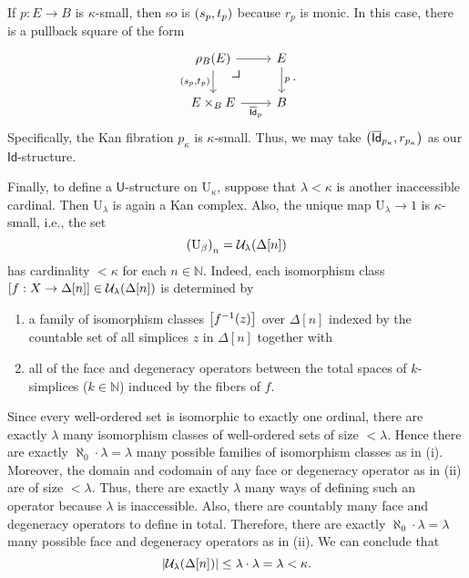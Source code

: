 \documentclass[10pt,letterpaper,cm]{nupset}
\theoremstyle{definition}
\theoremstyle{theorem}
\theoremstyle{remark}
\newcommand{\id}{\mathsf{Id}}
\newcommand{\U}{\mathsf{U}}
\newcommand{\0}{\mathbf{0}}
\newcommand{\1}{\mathbf{1}}
\newcommand{\2}{\mathbf{2}}
\newcommand{\N}{\mathbb N}
\newcommand{\be}{\begin{enumerate}}
\newcommand{\ee}{\end{enumerate}}
\begin{document}
\smallskip

If $p: E \to B$ is $\kappa$-small, then so is $\mleft(s_p, t_p\mright)$ because $r_p$ is monic. In this case, there is a pullback square of the form
\[
\begin{tikzcd}
\rho_B(E) \arrow[r] \arrow[d, "{\mleft(s_p, t_p\mright)}"'] \arrow[dr, phantom, "\scalebox{1.5}{\color{black}$\lrcorner$}" , very near start, color=black]
& E \arrow[d, "p"] \\
E\times_BE \arrow[r, "\overline{\id}_p"']                                      & B               
\end{tikzcd}.
\] 
Specifically,  the Kan fibration $p_{\kappa}$ is $\kappa$-small. Thus, we may take $\mleft(\overline{\id}_{p_{\kappa}}, r_{p_{\kappa}}\mright)$ as our $\id$-structure. 

\bigskip

Finally, to define a $\U$-structure on $\mathrm{U}_{\kappa}$, suppose that $\lambda < \kappa$ is another inaccessible cardinal. Then $\mathrm{U}_{\lambda}$ is again a Kan complex. Also, the unique map $\mathrm{U}_{\lambda} \to 1$ is $\kappa$-small, i.e., the set
\[
\mleft(\mathrm{U}_{\beta}\mright)_n  = \mathcal{U}_{\lambda}(\Delta[n])
\] has cardinality $<\kappa$ for each $n\in \N$. Indeed, each isomorphism class $\mleft[f: X\to \Delta[n]\mright]\in  \mathcal{U}_{\lambda}(\Delta[n])$ is determined by 
\be[label=(\roman*)]
\item a family of isomorphism classes $\mleft[f^{-1}(z)\mright]$ over $\Delta[n]$ indexed by the countable set of all simplices $z$ in $\Delta[n]$ together with
\item  all of the face and degeneracy operators between the total spaces of $k$-simplices ($k\in \N$) induced by the fibers of $f$.
\ee
Since every well-ordered set is isomorphic to exactly one ordinal, there are exactly $\lambda$ many isomorphism classes of well-ordered sets of size $< \lambda$. Hence there are exactly $\aleph_0 \cdot \lambda = \lambda$ many possible families of isomorphism classes as in (i). Moreover, the domain and codomain of any  face or degeneracy operator as in (ii) are of size $<\lambda$. Thus, there are exactly $\lambda$ many ways of defining such an operator because $\lambda$ is inaccessible. Also, there are countably many face and degeneracy operators to define in total. Therefore, there are exactly $\aleph_0 \cdot \lambda = \lambda$ many possible face and degeneracy operators as in (ii). We can conclude that 
\[
 \mleft\lvert{ \mathcal{U}_{\lambda}(\Delta[n])}\mright\rvert \leq \lambda \cdot \lambda = \lambda <\kappa
.\] 
\end{document}
